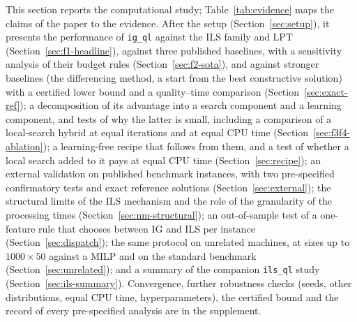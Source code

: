 \documentclass[final,3p,times,11pt,authoryear]{elsarticle}
\begin{document}
This section reports the computational study; Table~\ref{tab:evidence} maps the
claims of the paper to the evidence. After the setup (Section~\ref{sec:setup}), it
presents the performance of \texttt{ig\_ql} against the ILS family and LPT
(Section~\ref{sec:f1-headline}), against three published baselines, with a
sensitivity analysis of their budget rules (Section~\ref{sec:f2-sota}), and against
stronger baselines (the differencing method, a start from the best constructive
solution) with a certified lower bound and a quality--time comparison
(Section~\ref{sec:exact-ref}); a decomposition of its advantage into a search
component and a learning component, and tests of why the latter is small, including a
comparison of a local-search hybrid at equal iterations and at equal CPU time
(Section~\ref{sec:f3f4-ablation}); a learning-free recipe that follows from them, and a test of
whether a local search added to it pays at equal CPU time (Section~\ref{sec:recipe}); an external validation on published benchmark instances,
with two pre-specified confirmatory tests and exact reference solutions
(Section~\ref{sec:external}); the structural limits of the ILS mechanism and the role
of the granularity of the processing times (Section~\ref{sec:nm-structural}); an
out-of-sample test of a one-feature rule that chooses between IG and ILS per instance
(Section~\ref{sec:dispatch}); the same protocol on unrelated machines, at sizes up to
$1000\times50$ against a MILP and on the standard benchmark (Section~\ref{sec:unrelated}); and a summary of the companion \texttt{ils\_ql} study
(Section~\ref{sec:ils-summary}). Convergence, further robustness checks (seeds, other
distributions, equal CPU time, hyperparameters), the certified bound and the record of
every pre-specified analysis are in the supplement.
\end{document}
